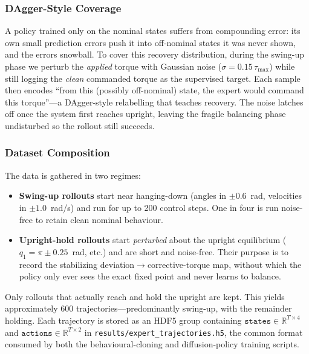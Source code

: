 \documentclass[11pt,a4paper]{article}
\newcommand{\file}[1]{\texttt{#1}}
\newcommand{\code}[1]{\texttt{#1}}
\begin{document}
\subsubsection{DAgger-Style Coverage}
A policy trained only on the nominal states suffers from compounding error: its own
small prediction errors push it into off-nominal states it was never shown, and the
errors snowball. To cover this recovery distribution, during the swing-up phase we
perturb the \emph{applied} torque with Gaussian noise
($\sigma = 0.15\,\tau_{\max}$) while still logging the \emph{clean} commanded torque
as the supervised target. Each sample then encodes ``from this (possibly
off-nominal) state, the expert would command this torque''---a DAgger-style
relabelling that teaches recovery. The noise latches off once the system first
reaches upright, leaving the fragile balancing phase undisturbed so the rollout
still succeeds.

\subsubsection{Dataset Composition}
The data is gathered in two regimes:
\begin{itemize}[leftmargin=1.5em]
  \item \textbf{Swing-up rollouts} start near hanging-down (angles in
  $\pm0.6$~rad, velocities in $\pm1.0$~rad/s) and run for up to 200 control steps.
  One in four is run noise-free to retain clean nominal behaviour.
  \item \textbf{Upright-hold rollouts} start \emph{perturbed} about the upright
  equilibrium ($q_1 = \pi \pm 0.25$~rad, etc.) and are short and noise-free. Their
  purpose is to record the stabilizing deviation$\rightarrow$corrective-torque map,
  without which the policy only ever sees the exact fixed point and never learns to
  balance.
\end{itemize}
Only rollouts that actually reach and hold the upright are kept. This yields
approximately 600 trajectories---predominantly swing-up, with the remainder
holding. Each trajectory is stored as an HDF5 group containing
$\code{states}\in\mathbb{R}^{T\times4}$ and
$\code{actions}\in\mathbb{R}^{T\times2}$ in
\file{results/\allowbreak expert\_\allowbreak trajectories.h5}, the common format consumed by both the
behavioural-cloning and diffusion-policy training scripts.
\end{document}
